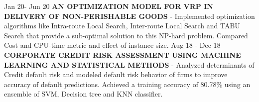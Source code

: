 \begin{cvskills}
  \cvskill
    {Jan 20- Jun 20}
    {\textbf{AN OPTIMIZATION MODEL FOR VRP IN DELIVERY OF NON-PERISHABLE GOODS} - Implemented optimization algorithms like Intra-route Local Search, Inter-route Local Search and TABU Search that provide a sub-optimal solution to this NP-hard problem. Compared Cost and CPU-time metric and effect of instance size.} %
  \cvskill
    {Aug 18 - Dec 18}
    {\textbf{CORPORATE CREDIT RISK ASSESSMENT USING MACHINE LEARNING AND STATISTICAL METHODS} - Analyzed determinants of Credit default risk and modeled default risk behavior of firms to improve accuracy of default predictions. Achieved a training accuracy of 80.78\% using an ensemble of SVM, Decision tree and KNN classifier.} %
\end{cvskills}  